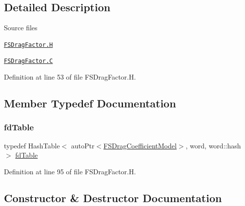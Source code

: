 \subsection{Detailed Description}
\begin{DoxyParagraph}{Source files}

\begin{DoxyItemize}
\item \href{../../../home/carlo/data/GeN-Foam/GeN-Foam_ffn/GeN-Foam/GeN-Foam/classes/thermalHydraulics/src/physicsModels/dragModels/FSDragFactor.H}{\tt F\+S\+Drag\+Factor.\+H} 
\item \href{../../../home/carlo/data/GeN-Foam/GeN-Foam_ffn/GeN-Foam/GeN-Foam/classes/thermalHydraulics/src/physicsModels/dragModels/FSDragFactor.C}{\tt F\+S\+Drag\+Factor.\+C} 
\end{DoxyItemize}
\end{DoxyParagraph}


Definition at line 53 of file F\+S\+Drag\+Factor.\+H.



\subsection{Member Typedef Documentation}
\mbox{\label{classFoam_1_1FSDragFactor_a7760b746b5c75541218a8e6bcf18af90}} 
\subsubsection{\texorpdfstring{fd\+Table}{fdTable}}
{\footnotesize\ttfamily typedef Hash\+Table$<$ auto\+Ptr$<$\hyperlink{classFoam_1_1FSDragCoefficientModel}{F\+S\+Drag\+Coefficient\+Model}$>$, word, word\+::hash $>$ \hyperlink{classFoam_1_1FSDragFactor_a7760b746b5c75541218a8e6bcf18af90}{fd\+Table}\hspace{0.3cm}{\ttfamily [protected]}}



Definition at line 95 of file F\+S\+Drag\+Factor.\+H.



\subsection{Constructor \& Destructor Documentation}
\mbox{\label{classFoam_1_1FSDragFactor_a98ed8145d598adb08c51756802f20f94}} 
